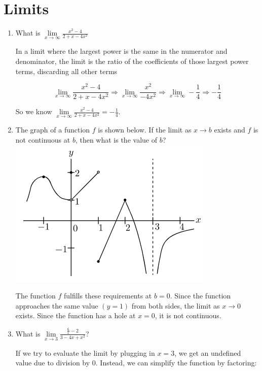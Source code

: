 \documentclass{article}
\begin{document}
\section{Limits}
\begin{enumerate}

\item What is $\underset{x\rightarrow\infty}{\lim}\frac{x^{2} - 4}{2 + x - 4x^{2}}$

In a limit where the largest power is the same in the numerator and denominator, the limit
is the ratio of the coefficients of those largest power terms, discarding all other terms

\[\underset{x\rightarrow\infty}{\lim}\frac{x^{2} - 4}{2 + x - 4x^{2}}
    \Longrightarrow \underset{x\rightarrow\infty}{\lim}\frac{x^{2}}{- 4x^{2}}
    \Longrightarrow \underset{x\rightarrow\infty}{\lim}-\frac{1}{4} \Longrightarrow -\frac{1}{4}\]

So we know $\underset{x\rightarrow\infty}{\lim}\frac{x^{2} - 4}{2 + x - 4x^{2}} = -\frac{1}{4}$.

\item The graph of a function $f$ is shown below. If the limit as $x \rightarrow b$ exists
and $f$ is not continuous at $b$, then what is the value of $b$?
\\\includegraphics[scale = 1]{Images/Limit1.png}

The function $f$ fulfills these requirements at $b = 0$.
Since the function approaches the same value $(y = 1)$ from both sides, the limit as $x \rightarrow 0$
exists.
Since the function has a hole at $x = 0$, it is not continuous.

\pagebreak
\item What is $\underset{x \rightarrow 3}{\lim}\frac{\frac{6}{x} - 2}{3 - 4x + x^{2}}$?

If we try to evaluate the limit by plugging in $x = 3$, we get an undefined value due to division by 0.
Instead, we can simplify the function by factoring:


\end{enumerate}
\end{document}
